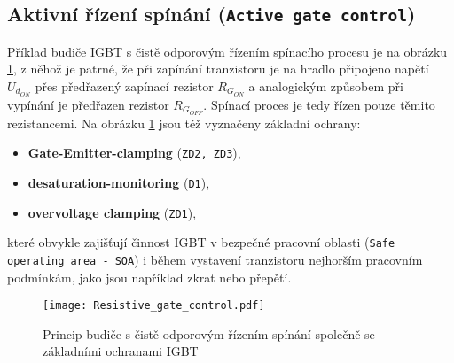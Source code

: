      \subsection{Aktivní řízení spínání (\texttt{Active gate con\-trol})}
       Příklad budiče IGBT s čistě odporovým řízením spínacího procesu je na obrázku 
       \ref{VE:fig_res_gate_drv}, z něhož je patrné, že při zapínání tranzistoru je na hradlo 
       připojeno napětí $U_{d_{ON}}$ přes předřazený zapínací rezistor $R_{G_{ON}}$ a analogickým 
       způsobem při vypínání je předřazen rezistor $R_{G_{OFF}}$. Spínací proces je tedy řízen 
       pouze těmito rezistancemi. Na obrázku \ref{VE:fig_res_gate_drv} jsou též vyznačeny základní 
       ochrany:
       \begin{itemize}
         \item \textbf{Gate-Emitter-clamping} (\texttt{ZD2, ZD3}),
         \item \textbf{desaturation-monitoring} (\texttt{D1}),
         \item \textbf{overvoltage clamping} (\texttt{ZD1}),
       \end{itemize}
      které obvykle zajišťují činnost IGBT v bezpečné pracovní oblasti (\texttt{Safe operating area 
      - SOA}) i během vystavení tranzistoru nejhorším pracovním podmínkám, jako jsou například 
      zkrat nebo přepětí.

      \begin{figure}[ht!]
        \centering
        \texttt{[image: Resistive\_gate\_control.pdf]}
        \caption{Princip budiče s čistě odporovým řízením spínání společně se základními ochranami IGBT}\label{VE:fig_res_gate_drv}
      \end{figure}


